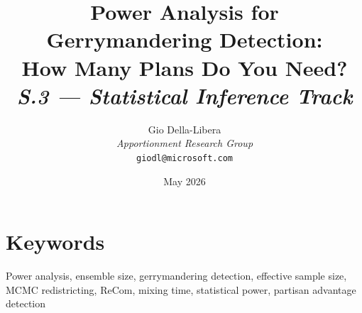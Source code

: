 \documentclass[12pt]{article}
\title{%
  \textbf{Power Analysis for Gerrymandering Detection:\\
  How Many Plans Do You Need?}\\[0.8em]
  \normalsize\textit{S.3 --- Statistical Inference Track}%
}
\author{%
  Gio Della-Libera\\
  \textit{Apportionment Research Group}\\
  \small\texttt{giodl@microsoft.com}
}
\date{May 2026}
\begin{document}
\maketitle

\begin{abstract}

\end{abstract}

\section*{Keywords}
Power analysis, ensemble size, gerrymandering detection, effective sample size,
MCMC redistricting, ReCom, mixing time, statistical power, partisan advantage detection

\tableofcontents
\newpage











\end{document}
